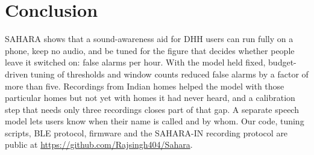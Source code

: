 \documentclass[conference,a4paper]{IEEEtran}
\begin{document}
\section{Conclusion}
SAHARA shows that a sound-awareness aid for DHH users can run fully on a phone, keep no audio, and be tuned for the figure that decides whether people leave it switched on: false alarms per hour. With the model held fixed, budget-driven tuning of thresholds and window counts reduced false alarms by a factor of more than five. Recordings from Indian homes helped the model with those particular homes but not yet with homes it had never heard, and a calibration step that needs only three recordings closes part of that gap. A separate speech model lets users know when their name is called and by whom. Our code, tuning scripts, BLE protocol, firmware and the SAHARA-IN recording protocol are public at \url{https://github.com/Rajsingh404/Sahara}.
\end{document}
